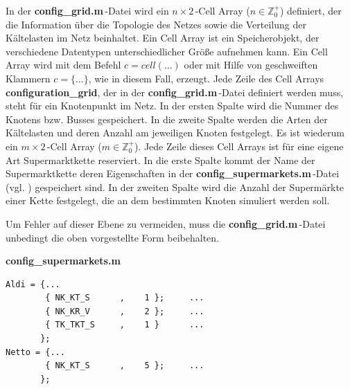 In der \textbf{config\_grid.m}$\,$-Datei wird  ein $n\times2\,$-Cell Array
($n\in \mathbb{Z}^+_0$) definiert, der die Information über die Topologie des
Netzes sowie die Verteilung der Kältelasten im Netz beinhaltet. Ein Cell Array
ist ein Speicherobjekt, der verschiedene Datentypen unterschiedlicher Größe
aufnehmen kann\cite[Teil 2, Seite 15]{MATLAB-Buch}.  Ein Cell Array wird mit dem
Befehl $c=cell(\ldots)$ oder mit Hilfe von geschweiften Klammern $c=\{\ldots\}$,
wie in diesem Fall, erzeugt. Jede Zeile des Cell Arrays
\textbf{configuration\_grid}, der in der \textbf{config\_grid.m}$\,$-Datei
definiert werden muss, steht für ein Knotenpunkt im Netz. In der ersten Spalte
wird die Nummer des Knotens bzw. Busses gespeichert. In die zweite Spalte
werden die Arten der Kältelasten und deren Anzahl am jeweiligen Knoten
festgelegt. Es ist wiederum ein $m\times2\,$-Cell Array ($m\in \mathbb{Z}^+_0$).
Jede Zeile dieses Cell Arrays ist für eine eigene Art Supermarktkette
reserviert. In die erste Spalte kommt der Name der Supermarktkette deren
Eigenschaften in der \textbf{config\_supermarkets.m$\,$}-Datei (vgl.
) gespeichert sind. In der zweiten Spalte wird die Anzahl der
Supermärkte einer Kette festgelegt, die an dem bestimmten Knoten simuliert werden
soll.

Um Fehler auf dieser Ebene zu vermeiden, muss die
\textbf{config\_grid.m}$\,$-Datei unbedingt die oben vorgestellte Form
beibehalten.

\vspace{3mm}
\noindent\textbf{config\_supermarkets.m}
\vspace{3mm}


\begin{lstlisting}[float=h!,caption=config\_supermarkets.m,label={csuper}]
%%       Kind of fridge     Anzahl
Aldi = {...
        { NK_KT_S      ,    1 };     ...
        { NK_KR_V      ,    2 };     ...
        { TK_TKT_S     ,    1 }      ...
       };
Netto = {...
        { NK_KT_S      ,    5 };     ...
       };
\end{lstlisting}

